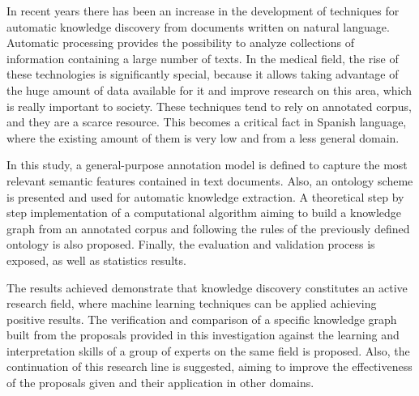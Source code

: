 \label{chapter:abstract_english}


In recent years there has been an increase in the development of techniques for automatic knowledge discovery from documents written on natural language. Automatic processing provides the possibility to analyze collections of information containing a large number of texts. In the medical field, the rise of these technologies is significantly special, because it allows taking advantage of the huge amount of data available for it and improve research on this area, which is really important to society. These techniques tend to rely on annotated corpus, and they are a scarce resource. This becomes a critical fact in Spanish language, where the existing amount of them is very low and from a less general domain.

In this study, a general-purpose annotation model is defined to capture the most relevant semantic features contained in text documents. Also, an ontology scheme is presented and used for automatic knowledge extraction. A theoretical step by step implementation of a computational algorithm aiming to build a knowledge graph from an annotated corpus and following the rules of the previously defined ontology is also proposed. Finally, the evaluation and validation process is exposed, as well as statistics results.

The results achieved demonstrate that knowledge discovery constitutes an active research field, where machine learning techniques can be applied achieving positive results. The verification and comparison of a specific knowledge graph built from the proposals provided in this investigation against the learning and interpretation skills of a group of experts on the same field is proposed. Also, the continuation of this research line is suggested, aiming to improve the effectiveness of the proposals given and their application in other domains.